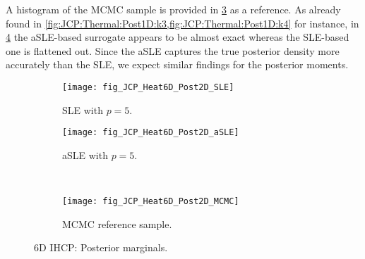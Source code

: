A histogram of the MCMC sample is provided in \cref{fig:JCP:Thermal:Post2D:MCMC} as a reference.
As already found in \cref{fig:JCP:Thermal:Post1D:k3,fig:JCP:Thermal:Post1D:k4} for instance,
in \cref{fig:JCP:Thermal:Post2D} the aSLE-based surrogate appears to be almost exact whereas the SLE-based one is flattened out.
Since the aSLE captures the true posterior density more accurately than the SLE, we expect similar findings for the posterior moments.
\begin{figure}[htbp]
  \centering
  \begin{subfigure}[b]{\JCPsubWidth}
    \centering
    \texttt{[image: fig\_JCP\_Heat6D\_Post2D\_SLE]}
    \caption{SLE with \(p = 5\).}
    \label{fig:JCP:Thermal:Post2D:SLE}
  \end{subfigure}\hfill%
  \begin{subfigure}[b]{\JCPsubWidth}
    \centering
    \texttt{[image: fig\_JCP\_Heat6D\_Post2D\_aSLE]}
    \caption{aSLE with \(p = 5\).}
    \label{fig:JCP:Thermal:Post2D:aSLE}
  \end{subfigure}\\[1ex]%
  \begin{subfigure}[b]{\JCPsubWidth}
    \centering
    \texttt{[image: fig\_JCP\_Heat6D\_Post2D\_MCMC]}
    \caption{MCMC reference sample.}
    \label{fig:JCP:Thermal:Post2D:MCMC}
  \end{subfigure}%
  \caption[6D IHCP: Posterior marginals]{6D IHCP: Posterior marginals.}
  \label{fig:JCP:Thermal:Post2D}
\end{figure}

